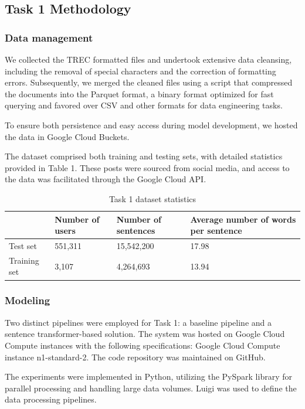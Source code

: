 \documentclass[]{style/ceurart}
\begin{document}
\subsection{Task 1 Methodology}

\subsubsection{Data management}
We collected the TREC formatted files and undertook extensive data cleansing, including the removal of special characters and the correction of formatting errors. Subsequently, we merged the cleaned files using a script that compressed the documents into the Parquet format, a binary format optimized for fast querying and favored over CSV and other formats for data engineering tasks.

To ensure both persistence and easy access during model development, we hosted the data in Google Cloud Buckets.

The dataset comprised both training and testing sets, with detailed statistics provided in Table 1. These posts were sourced from social media, and access to the data was facilitated through the Google Cloud API.


\begin{table}[]
\caption{Task 1 dataset statistics}
\begin{tabular}{llll}
             & Number of users & Number of sentences & Average number of words per sentence \\ \hline
Test set     & 551,311         & 15,542,200          & 17.98                                \\ \hline
Training set & 3,107           & 4,264,693           & 13.94                                \\ \hline
\end{tabular}
\end{table}



\subsubsection{Modeling}

Two distinct pipelines were employed for Task 1: a baseline pipeline and a sentence transformer-based solution. The system was hosted on Google Cloud Compute instances with the following specifications: Google Cloud Compute instance n1-standard-2. The code repository was maintained on GitHub.

The experiments were implemented in Python, utilizing the PySpark library for parallel processing and handling large data volumes. Luigi was used to define the data processing pipelines. 
\end{document}
